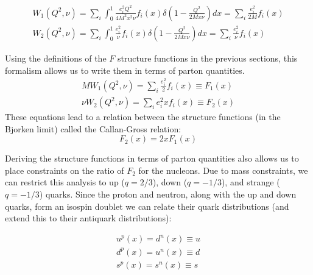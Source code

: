 \begin{subequations}
\begin{align}
	W_{1}\left(Q^{2},\nu\right) = \sum_{i}\int_0^1 \frac{e_{i}^{2}Q^2}{4M^{2}x^{2}\nu}f_{i}\left(x\right)\delta\left(1-\frac{Q^2}{2Mx\nu}\right) dx = \sum_{i} \frac{e_{i}^{2}}{2M}f_{i}\left(x\right) \\
	W_{2}\left(Q^{2},\nu\right) = \sum_{i}\int_0^1 \frac{e_{i}^{2}}{\nu}f_{i}\left(x\right)\delta\left(1-\frac{Q^2}{2Mx\nu}\right) dx = \sum_{i} \frac{e_{i}^{2}}{\nu}f_{i}\left(x\right)
\end{align}
\end{subequations}

Using the definitions of the $F$ structure functions in the previous sections, this formalism allows us to write them in terms of parton quantities.
\begin{subequations}
\begin{align}
	MW_1\left(Q^2,\nu\right) = \sum_i \frac{e_i^2}{2} f_i\left(x\right) \equiv F_1\left(x\right) \\
	\nu W_2\left(Q^2,\nu\right) = \sum_i e_i^2 x f_i\left(x\right) \equiv F_2\left(x\right)
\end{align}
\end{subequations}
These equations lead to a relation between the structure functions (in the Bjorken limit) called the Callan-Gross relation:
\begin{equation}
	F_2\left(x\right) = 2xF_1\left(x\right)
\end{equation}


Deriving the structure functions in terms of parton quantities also allows us to place constraints on the ratio of $F_2$ for the nucleons. Due to mass constraints, we can restrict this analysis to up ($q=2/3$), down ($q=-1/3$), and strange ($q=-1/3$) quarks. Since the proton and neutron, along with the up and down quarks, form an isospin doublet we can relate their quark distributions (and extend this to their antiquark distributions):

\begin{subequations}
\begin{align}
	u^p\left(x\right) = d^n\left(x\right) \equiv u \\
	d^p\left(x\right) = u^n\left(x\right) \equiv d \\
	s^p\left(x\right) = s^n\left(x\right) \equiv s 
\end{align}
\end{subequations}

